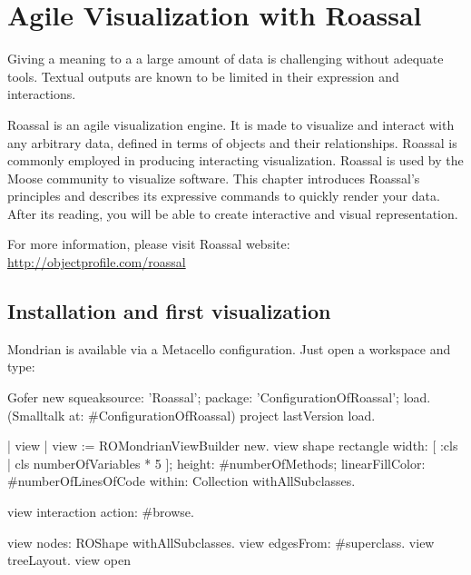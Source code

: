 \documentclass[a4paper,10pt,twoside]{book}
\begin{document}
\fi
\sloppy
\chapter{Agile Visualization with Roassal}


Giving a meaning to a a large amount of data is challenging without adequate tools. Textual outputs are known to be limited in their expression and interactions. 

Roassal is an agile visualization engine. It is made to visualize and interact with any arbitrary data, defined in terms of objects and their relationships. Roassal is commonly employed in producing interacting  visualization. Roassal is used by the Moose community to visualize software. This chapter introduces Roassal's principles and describes its expressive commands to quickly render your data. After its reading, you will be able to create interactive and visual representation.

For more information, please visit Roassal website: \url{http://objectprofile.com/roassal}

\section{Installation and first visualization}

Mondrian is available via a Metacello configuration. Just open a workspace and type:
\begin{code}{}
Gofer new
	squeaksource: 'Roassal'; 
	package: 'ConfigurationOfRoassal';
	load.
(Smalltalk at: #ConfigurationOfRoassal) project lastVersion load.
\end{code}


\begin{code}{}
| view |
view := ROMondrianViewBuilder new.
view shape rectangle 
	width:  [ :cls | cls numberOfVariables * 5 ];  
	height: #numberOfMethods;
	linearFillColor: #numberOfLinesOfCode within:  Collection withAllSubclasses.
		
view interaction action: #browse.

view nodes: ROShape withAllSubclasses.
view edgesFrom: #superclass.
view treeLayout.
view open
\end{code}
\end{document}
